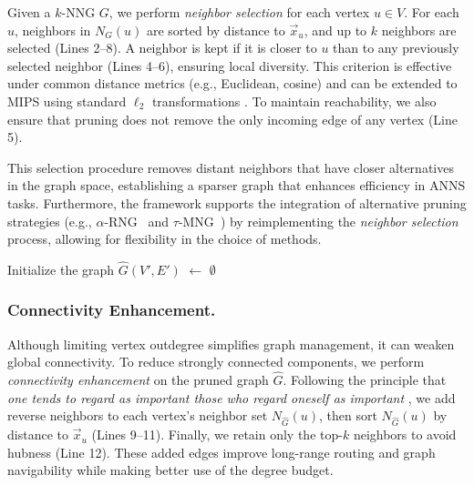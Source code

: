 \documentclass[acmsmall]{acmart}
\theoremstyle{remark}
\theoremstyle{definition}
\begin{document}
Given a $k$-NNG $G$, we perform \textit{neighbor selection} for each vertex $u \in V$. For each $u$, neighbors in $N_G(u)$ are sorted by distance to $\vec{x}_u$, and up to $k$ neighbors are selected (Lines 2–8). A neighbor is kept if it is closer to $u$ than to any previously selected neighbor (Lines 4–6), ensuring local diversity. This criterion is effective under common distance metrics (e.g., Euclidean, cosine) and can be extended to MIPS using standard $\ell_2$ transformations \cite{chen2025maximum}. To maintain reachability, we also ensure that pruning does not remove the only incoming edge of any vertex (Line 5).

This selection procedure removes distant neighbors that have closer alternatives in the graph space, establishing a sparser graph that enhances efficiency in ANNS tasks. Furthermore, the framework supports the integration of alternative pruning strategies (e.g., $\alpha$-RNG~\cite{jayaram2019diskann} and $\tau$-MNG~\cite{peng2023efficient}) by reimplementing the \textit{neighbor selection} process, allowing for flexibility in the choice of methods.

\begin{algorithm}[t]\small
	\DontPrintSemicolon
	
	Initialize the graph $\hat{G}(V', E')$ $\gets$ $\emptyset$\;
	
	\;
	
	\caption{$k$-NNG to PG Transformation}
	\label{alg:prune}
\end{algorithm}

\subsubsection{Connectivity Enhancement.}

Although limiting vertex outdegree simplifies graph management, it can weaken global connectivity. To reduce strongly connected components, we perform \textit{connectivity enhancement} on the pruned graph $\hat{G}$. Following the principle that \textit{one tends to regard as important those who regard oneself as important} \cite{ootomo2024cagra}, we add reverse neighbors to each vertex’s neighbor set $N_{\hat{G}}(u)$, then sort $N_{\hat{G}}(u)$ by distance to $\vec{x}_u$ (Lines 9–11). Finally, we retain only the top-$k$ neighbors to avoid hubness (Line 12). These added edges improve long-range routing and graph navigability \cite{prokhorenkova2020graph} while making better use of the degree budget.
\end{document}
